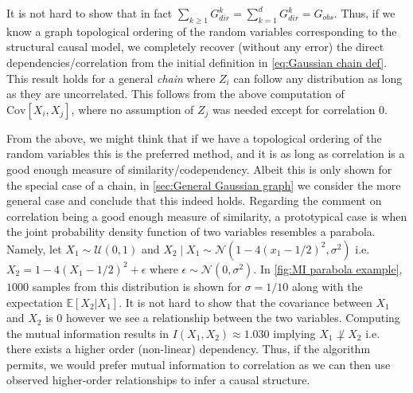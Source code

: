 \documentclass[../Thesis.tex]{subfiles}
\begin{document}
It is not hard to show that in fact $\sum_{k\geq 1} G_{dir}^k = \sum_{k=1}^d G_{dir}^k = G_{obs}$. Thus, if we know a graph topological ordering of the random variables corresponding to the structural causal model, we completely recover (without any error) the direct dependencies/correlation from the initial definition in \autoref{eq:Gaussian chain def}. This result holds for a general \textit{chain} where $Z_i$ can follow any distribution as long as they are uncorrelated. This follows from the above computation of $\text{Cov}\left[X_i, X_j\right]$, where no assumption of $Z_j$ was needed except for correlation $0$.

From the above, we might think that if we have a topological ordering of the random variables this is the preferred method, and it is as long as correlation is a good enough measure of similarity/codependency. Albeit this is only shown for the special case of a chain, in \autoref{sec:General Gaussian graph} we consider the more general case and conclude that this indeed holds. Regarding the comment on correlation being a good enough measure of similarity, a prototypical case is when the joint probability density function of two variables resembles a parabola. Namely, let $X_1\sim \mathcal{U}\left(0,1\right)$ and $X_2 \mid X_1 \sim \mathcal{N}\left(1 - 4\left(x_1 - 1/2\right)^2 , \sigma^2\right)$ i.e. $X_2 = 1 - 4 \left(X_1 - 1/2\right)^2 + \epsilon$ where $\epsilon \sim \mathcal{N}\left(0,\sigma^2\right)$. In \autoref{fig:MI parabola example}, $1000$ samples from this distribution is shown for $\sigma = 1/10$ along with the expectation $\mathbb{E}\left[X_2 | X_1\right]$. It is not hard to show that the covariance between $X_1$ and $X_2$ is $0$ however we see a relationship between the two variables. Computing the mutual information results in $I\left(X_1, X_2\right) \approx 1.030$ implying $X_1 \not\perp X_2$ i.e. there exists a higher order (non-linear) dependency. Thus, if the algorithm permits, we would prefer mutual information to correlation as we can then use observed higher-order relationships to infer a causal structure.
\end{document}
